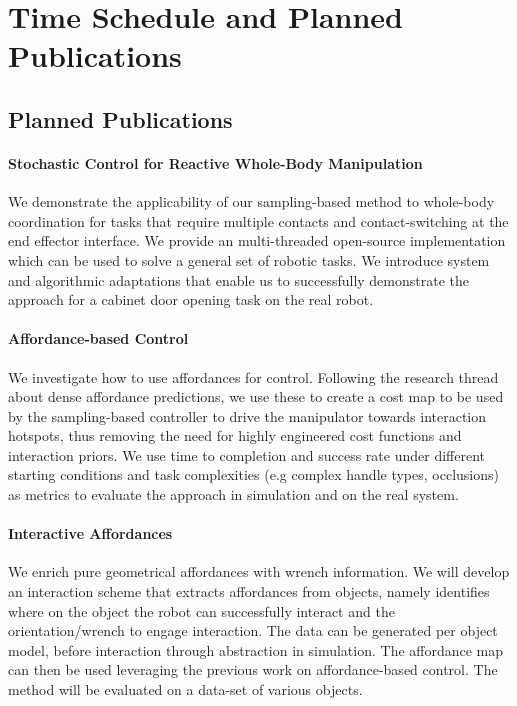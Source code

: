 \section{Time Schedule and Planned Publications}
\label{sec:time_schedule}


\subsection{Planned Publications}
\paragraph{Stochastic Control for Reactive Whole-Body Manipulation} We demonstrate the applicability of our sampling-based method to whole-body coordination for tasks that require multiple contacts and contact-switching at the end effector interface. We provide an multi-threaded open-source implementation which can be used to solve a general set of robotic tasks. We introduce system and algorithmic adaptations that enable us to successfully demonstrate the approach for a cabinet door opening task on the real robot.

\paragraph{Affordance-based Control} We investigate how to use affordances for control. Following the research thread about dense affordance predictions, we use these to create a cost map to be used by the sampling-based controller to drive the manipulator towards interaction hotspots, thus removing the need for highly engineered cost functions and interaction priors. We use time to completion and success rate under different starting conditions and task complexities (e.g complex handle types, occlusions) as metrics to evaluate the approach in simulation and on the real system. 

\paragraph{Interactive Affordances} We enrich pure geometrical affordances with wrench information. We will develop an interaction scheme that extracts affordances from objects, namely identifies where on the object the robot can successfully interact and the orientation/wrench to engage interaction. The data can be generated per object model, before interaction through abstraction in simulation. The affordance map can then be used leveraging the previous work on affordance-based control. The method will be evaluated on a data-set of various objects. 

